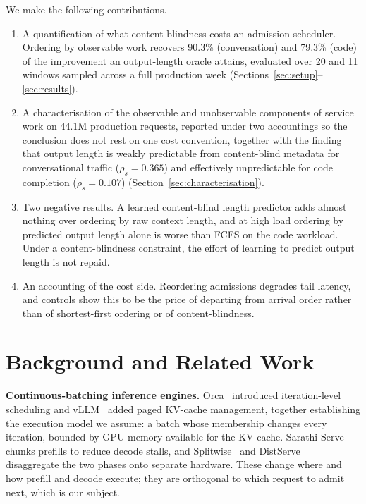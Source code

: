 \documentclass[conference,10pt,letterpaper]{IEEEtran}
\begin{document}
We make the following contributions.

\begin{enumerate}
\item A quantification of what content-blindness costs an admission scheduler.
      Ordering by observable work recovers 90.3\% (conversation) and 79.3\%
      (code) of the improvement an output-length oracle attains, evaluated over
      20 and 11 windows sampled across a full production week
      (Sections~\ref{sec:setup}--\ref{sec:results}).
\item A characterisation of the observable and unobservable components of
      service work on 44.1M production requests, reported under two accountings
      so the conclusion does not rest on one cost convention, together with the
      finding that output length is weakly predictable from content-blind
      metadata for conversational traffic ($\rho_s = 0.365$) and effectively
      unpredictable for code completion ($\rho_s = 0.107$)
      (Section~\ref{sec:characterisation}).
\item Two negative results. A learned content-blind length predictor adds
      almost nothing over ordering by raw context length, and at high load
      ordering by predicted output length alone is worse than FCFS on the code
      workload. Under a content-blindness constraint, the effort of learning to
      predict output length is not repaid.
\item An accounting of the cost side. Reordering admissions degrades tail
      latency, and controls show this to be the price of departing from arrival
      order rather than of shortest-first ordering or of content-blindness.
\end{enumerate}

\section{Background and Related Work}
\label{sec:related}

\textbf{Continuous-batching inference engines.}
Orca~\cite{yu2022orca} introduced iteration-level scheduling and
vLLM~\cite{kwon2023pagedattention} added paged KV-cache management, together
establishing the execution model we assume: a batch whose membership changes
every iteration, bounded by GPU memory available for the KV cache.
Sarathi-Serve~\cite{agrawal2024sarathi} chunks prefills to reduce decode stalls,
and Splitwise~\cite{patel2024splitwise} and DistServe~\cite{zhong2024distserve}
disaggregate the two phases onto separate hardware. These change where and how
prefill and decode execute; they are orthogonal to which request to admit next,
which is our subject.
\end{document}
